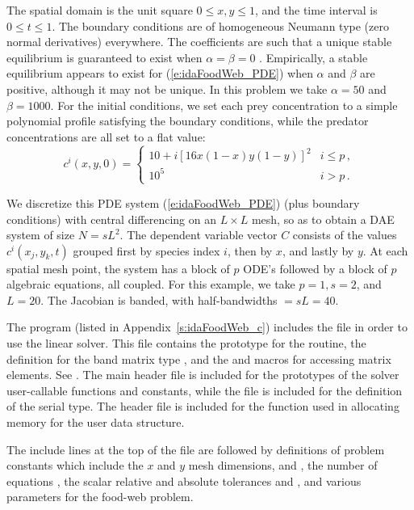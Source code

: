 The spatial domain is the unit square $0 \leq x,y \leq 1$, and the
time interval is $0 \leq t \leq 1$.  The boundary conditions are of
homogeneous Neumann type (zero normal derivatives) everywhere.  
The coefficients
are such that a unique stable equilibrium is guaranteed to exist when
$\alpha = \beta = 0$ \cite{Bro:86}.  Empirically, a stable equilibrium
appears to exist for (\ref{e:idaFoodWeb_PDE}) when $\alpha$ and $\beta$ are
positive, although it may not be unique. In this problem we take
$\alpha = 50$ and $\beta = 1000$.  For the initial conditions, we set
each prey concentration to a simple polynomial profile satisfying the
boundary conditions, while the predator concentrations are all set to
a flat value:
\begin{equation*}
c^i(x,y,0) = 
\begin{cases}
  10 + i [16x(1 - x)y(1 - y)]^2 & i \leq p \, , \\
  10^5                          & i > p \, .
\end{cases}
\end{equation*}

We discretize this PDE system (\ref{e:idaFoodWeb_PDE}) (plus boundary conditions)
with central differencing on an $L \times L$ mesh, so as to obtain a
DAE system of size $N = s L^2$.  The dependent variable vector $C$
consists of the values $c^i(x_j,y_k,t)$ grouped first by species index
$i$, then by $x$, and lastly by $y$.  At each spatial mesh point, the
system has a block of $p$ ODE's followed by a block of $p$ algebraic
equations, all coupled.
For this example, we take $p = 1, s = 2$, and $L = 20$.
The Jacobian is banded, with half-bandwidths  $= sL = 40$.

The  program (listed in Appendix~\ref{s:idaFoodWeb_c})
includes the file  in order to use the {\idaband} linear solver. 
This file contains the prototype for the  routine,
the definition for the band matrix type , and the
 and  macros for accessing matrix
elements. See .
The main {\ida} header file  is included for the prototypes of the
solver user-callable functions and {\ida} constants, while the file
 is included for the definition of the serial
 type.  The header file  is included for the
 function used in allocating memory for the user data structure.

The include lines at the top of the file are followed by definitions of
problem constants which include the $x$ and $y$ mesh dimensions,  and
, the number of equations , the scalar relative and absolute
tolerances  and , and various parameters for the food-web problem.


